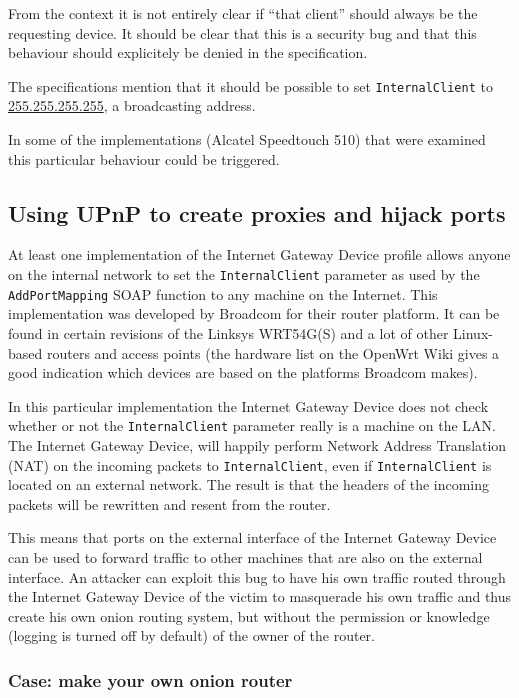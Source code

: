 \documentclass[10pt]{article}
\begin{document}
From the context it is not entirely clear if ``that client'' should always be
the requesting device. It should be clear that this is a security bug
and that this behaviour should explicitely be denied in the specification.

The specifications mention that it should be possible to set
\texttt{InternalClient} to \url{255.255.255.255}, a broadcasting address.

In some of the implementations (Alcatel Speedtouch 510) that were examined
this particular behaviour could be triggered.


\subsection{Using UPnP to create proxies and hijack ports}


At least one implementation of the Internet Gateway Device profile allows
anyone on the internal network to set the \texttt{InternalClient} parameter
as used by the \texttt{AddPortMapping} SOAP function to any machine on the
Internet. This implementation was developed by Broadcom for their router
platform. It can be found in certain revisions of the Linksys WRT54G(S) and
a lot of other Linux-based routers and access points (the hardware list on the
OpenWrt Wiki\cite{openwrt} gives a good indication which devices are based on
the platforms Broadcom makes).

In this particular implementation the Internet Gateway Device does not check
whether or not the \texttt{InternalClient} parameter really is a machine on
the LAN. The Internet Gateway Device, will happily perform Network Address
Translation (NAT) on the incoming packets to \texttt{InternalClient}, even if
\texttt{InternalClient} is located on an external network. The result is that
the headers of the incoming packets will be rewritten and resent from the
router.

This means that ports on the external interface of the Internet Gateway Device
can be used to forward traffic to other machines that are also on the external
interface. An attacker can exploit this bug to have his own traffic routed
through the Internet Gateway Device of the victim to masquerade his own traffic
and thus create his own onion routing system\cite{onion}\cite{tor}, but
without the permission or knowledge (logging is turned off by default) of the
owner of the router.

\subsubsection{Case: make your own onion router}
\end{document}
